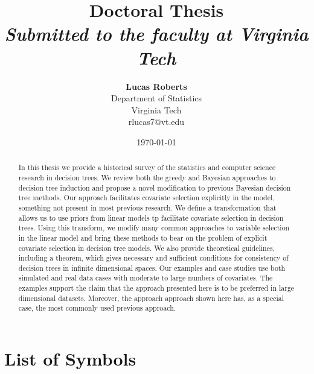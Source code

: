\documentclass[12pt]{article}
\title{{\bf Doctoral Thesis } \\
\it Submitted to the faculty at Virginia Tech}
\author{ {\bf Lucas Roberts}  \\
Department of Statistics \\
Virginia Tech \\
{\small rlucas7@vt.edu}
}
\date{\today}
\def\listofsymbols{ \clearpage}
\begin{document}
\pagestyle{plain}
\maketitle


\pagebreak
\begin{abstract}
In this thesis we provide a historical survey of the statistics and computer science research in decision trees. We review both the greedy and Bayesian approaches to decision tree induction and propose a novel modification to previous Bayesian decision tree methods. Our approach facilitates covariate selection explicitly in the model, something not present in most previous research. We define a transformation that allows us to use priors from linear models tp facilitate covariate selection in decision trees. Using this transform, we modify many common approaches to variable selection in the linear model and bring these methods to bear on the problem of explicit covariate selection in decision tree models. We also provide theoretical guidelines, including a theorem, which gives necessary and sufficient conditions for consistency of decision trees in infinite dimensional spaces. Our examples and case studies use both simulated and real data cases with moderate to large numbers of covariates. The examples support the claim that the approach presented here is to be preferred in large dimensional datasets. Moreover, the approach approach shown here has, as a special case, the most commonly used previous approach.    


\end{abstract}

\pagebreak
\tableofcontents
\pagebreak

\listoffigures
\pagebreak

\listoftables
\pagebreak

\clearpage
{}
\chapter{\LARGE{\textbf{List of Symbols}}}
\listofsymbols
\pagebreak
\end{document}
